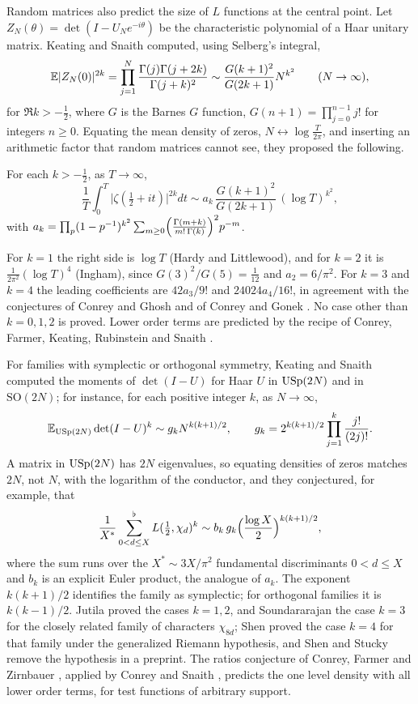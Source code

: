 Random matrices also predict the size of $L$ functions at the central point. Let $Z_N(\theta)=\det(I-U_Ne^{-i\theta})$ be the characteristic polynomial of a Haar unitary matrix. Keating and Snaith \cite{keatingsnaith2000} computed, using Selberg's integral,
\[
\mathbb{E}|Z_N(0)|^{2k}=\prod_{j=1}^N\frac{\Gamma(j)\Gamma(j+2k)}{\Gamma(j+k)^2}\sim\frac{G(k+1)^2}{G(2k+1)}N^{k^2}\qquad(N\to\infty),
\]
for $\Re k>-\frac12$, where $G$ is the Barnes $G$ function, $G(n+1)=\prod_{j=0}^{n-1}j!$ for integers $n\ge0$. Equating the mean density of zeros, $N\leftrightarrow\log\frac{T}{2\pi}$, and inserting an arithmetic factor that random matrices cannot see, they proposed the following.

\begin{conjecture}\label{conj:ch6ks}
For each $k>-\frac12$, as $T\to\infty$,
\[
\frac1T\int_0^T\bigl|\zeta(\tfrac12+it)\bigr|^{2k}dt\sim a_k\,\frac{G(k+1)^2}{G(2k+1)}\,(\log T)^{k^2},
\]
with $a_k=\prod_p(1-p^{-1})^{k^2}\sum_{m\ge0}\Bigl(\frac{\Gamma(m+k)}{m!\,\Gamma(k)}\Bigr)^2p^{-m}$.
\end{conjecture}

For $k=1$ the right side is $\log T$ (Hardy and Littlewood), and for $k=2$ it is $\frac{1}{2\pi^2}(\log T)^4$ (Ingham), since $G(3)^2/G(5)=\frac1{12}$ and $a_2=6/\pi^2$. For $k=3$ and $k=4$ the leading coefficients are $42a_3/9!$ and $24024a_4/16!$, in agreement with the conjectures of Conrey and Ghosh \cite{conreyghosh1998} and of Conrey and Gonek \cite{conreygonek2001}. No case other than $k=0,1,2$ is proved. Lower order terms are predicted by the recipe of Conrey, Farmer, Keating, Rubinstein and Snaith \cite{cfkrs2005}.

For families with symplectic or orthogonal symmetry, Keating and Snaith \cite{keatingsnaith2000b} computed the moments of $\det(I-U)$ for Haar $U$ in $\mathrm{USp}(2N)$ and in $\mathrm{SO}(2N)$; for instance, for each positive integer $k$, as $N\to\infty$,
\[
\mathbb{E}_{\mathrm{USp}(2N)}\det(I-U)^k\sim g_kN^{k(k+1)/2},\qquad g_k=2^{k(k+1)/2}\prod_{j=1}^k\frac{j!}{(2j)!}.
\]
A matrix in $\mathrm{USp}(2N)$ has $2N$ eigenvalues, so equating densities of zeros matches $2N$, not $N$, with the logarithm of the conductor, and they conjectured, for example, that
\[
\frac{1}{X^*}\sum_{0<d\le X}^{\flat}L(\tfrac12,\chi_d)^k\sim b_k\,g_k\Bigl(\frac{\log X}{2}\Bigr)^{k(k+1)/2},
\]
where the sum runs over the $X^*\sim3X/\pi^2$ fundamental discriminants $0<d\le X$ and $b_k$ is an explicit Euler product, the analogue of $a_k$. The exponent $k(k+1)/2$ identifies the family as symplectic; for orthogonal families it is $k(k-1)/2$. Jutila \cite{jutila1981} proved the cases $k=1,2$, and Soundararajan \cite{soundararajan2000} the case $k=3$ for the closely related family of characters $\chi_{8d}$; Shen \cite{shen2021} proved the case $k=4$ for that family under the generalized Riemann hypothesis, and Shen and Stucky \cite{shenstucky2024} remove the hypothesis in a preprint. The ratios conjecture of Conrey, Farmer and Zirnbauer \cite{cfz2008}, applied by Conrey and Snaith \cite{conreysnaith2007}, predicts the one level density with all lower order terms, for test functions of arbitrary support.

